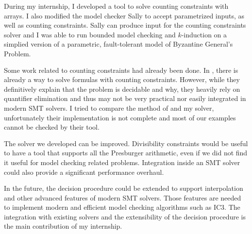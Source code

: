 
During my internship, I developed a tool to solve counting constraints with arrays.
I also modified the model checker Sally to accept parametrized inputs, as well as
counting constraints. Sally can produce input for the counting constraints
solver and I was able to run bounded model checking and $k$-induction on a
simplied version of a parametric, fault-tolerant model of Byzantine General's
Problem.

Some work related to counting constraints had already been done. In \cite{AlbertiGP16, schweikardt}, there is already a way to solve
formulas with counting constraints. However, while they definitively explain that the problem
is decidable and why, they heavily rely on quantifier elimination and
thus may not be very practical nor easily integrated in modern SMT
solvers. I tried to compare the method of \cite{AlbertiGP16} and my solver,
unfortunately their implementation is not complete and most of our examples
cannot be checked by their tool.

The solver we developed can be improved. Divisibility constraints would be
useful to have a tool that supports all the Presburger arithmetic, even if we
did not find it useful for model checking related problems. Integration inside
an SMT solver could also provide a significant performance overhaul.

In the future, the decision procedure could be extended to support
interpolation and other advanced features of modern SMT solvers. Those features
are needed to implement modern and efficient model checking algorithms such as
IC3. The integration with existing solvers and the extensibility of the decision
procedure is the main contribution of my internship.

